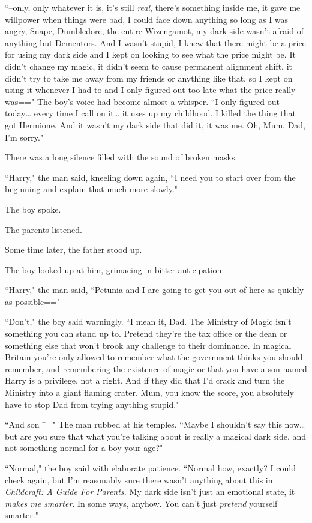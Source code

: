 ``\---only, only whatever it is, it's still \emph{real}, there's something inside me, it gave me willpower when things were bad, I could face down anything so long as I was angry, Snape, Dumbledore, the entire Wizengamot, my dark side wasn't afraid of anything but Dementors. And I wasn't stupid, I knew that there might be a price for using my dark side and I kept on looking to see what the price might be. It didn't change my magic, it didn't seem to cause permanent alignment shift, it didn't try to take me away from my friends or anything like that, so I kept on using it whenever I had to and I only figured out too late what the price really was\===" The boy's voice had become almost a whisper. ``I only figured out today{\ldots} every time I call on it{\ldots} it uses up my childhood. I killed the thing that got Hermione. And it wasn't my dark side that did it, it was me. Oh, Mum, Dad, I'm sorry."

There was a long silence filled with the sound of broken masks.

``Harry," the man said, kneeling down again, ``I need you to start over from the beginning and explain that much more slowly."

The boy spoke.

The parents listened.

Some time later, the father stood up.

The boy looked up at him, grimacing in bitter anticipation.

``Harry," the man said, ``Petunia and I are going to get you out of here as quickly as possible\==="

``Don't," the boy said warningly. ``I mean it, Dad. The Ministry of Magic isn't something you can stand up to. Pretend they're the tax office or the dean or something else that won't brook any challenge to their dominance. In magical Britain you're only allowed to remember what the government thinks you should remember, and remembering the existence of magic or that you have a son named Harry is a privilege, not a right. And if they did that I'd crack and turn the Ministry into a giant flaming crater. Mum, you know the score, you absolutely have to stop Dad from trying anything stupid."

``And son\===" The man rubbed at his temples. ``Maybe I shouldn't say this now{\ldots} but are you sure that what you're talking about is really a magical dark side, and not something normal for a boy your age?"

``Normal," the boy said with elaborate patience. ``Normal how, exactly? I could check again, but I'm reasonably sure there wasn't anything about this in \emph{Childcraft: A Guide For Parents.} My dark side isn't just an emotional state, it \emph{makes me smarter}. In some ways, anyhow. You can't just \emph{pretend} yourself smarter."

